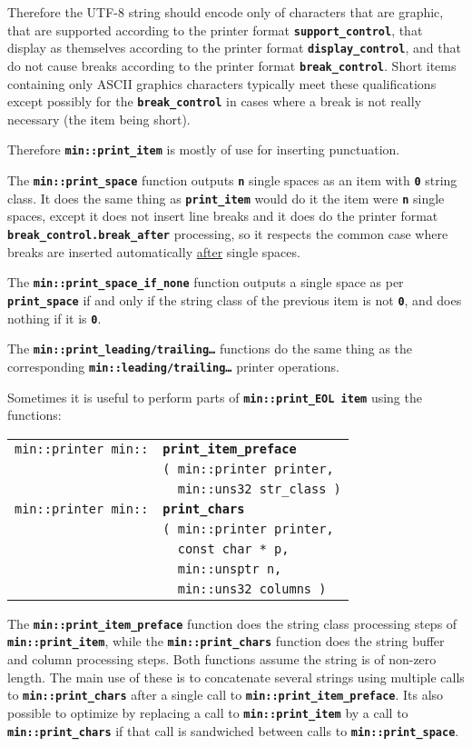 \documentclass[12pt]{article}
\makeatletter
\newcommand{\TT}[1]{{\tt \bfseries #1}}
\newcommand{\ttindex}[1]{\index{#1@{\tt #1}}}
\newcommand{\EOL}{\penalty \exhyphenpenalty}
\newenvironment{indpar}[1][0.3in]%
	{\begin{list}{}%
		     {\setlength{\itemsep}{0in}%
		      \setlength{\topsep}{0in}%
		      \setlength{\parsep}{1ex}%
		      \setlength{\labelwidth}{#1}%
		      \setlength{\leftmargin}{#1}%
		      \addtolength{\leftmargin}{\labelsep}}%
	 \item}%
	{\end{list}}
\newcommand{\LABEL}[1]{\label{#1}}
\newlength{\ARGBREAKLENGTH}
\newcommand{\ARGBREAK}[1][\ARGBREAKLENGTH]{\\&\hspace*{#1}}
\newcommand{\MINKEY}[1]%
	   {\TT{#1}\ttindex{min::#1}\ttindex{#1}}
\makeatother
\begin{document}
Therefore the UTF-8 string should encode only of characters
that are graphic, that are supported according to
the printer format \TT{support\_\EOL control},
that display as themselves according to the
printer format \TT{display\_\EOL control},
and that do not cause breaks according to the
printer format \TT{break\_\EOL control}.
Short items containing only ASCII graphics characters
typically meet these qualifications except possibly for
the \TT{break\_\EOL control} in cases where a break is not
really necessary (the item being short).

Therefore \TT{min::print\_item} is mostly of use for inserting
punctuation.

The \TT{min::print\_space} function outputs \TT{n} single spaces
as an item with \TT{0} string class.  It does the same thing
as \TT{print\_item} would do it the item were \TT{n} single spaces,
except it does not insert line breaks and it does do the
printer format \TT{break\_\EOL control.break\_\EOL after}
processing, so it respects the common case where breaks are inserted
automatically \underline{after} single spaces.

The \TT{min::print\_space\_if\_none} function outputs a single space
as per \TT{print\_space} if and only if the string class of the
previous item is not \TT{0}, and does nothing if it is \TT{0}.

The \TT{min::print\_leading/trailing\ldots} functions do the same thing as the
corresponding \TT{min::\EOL leading/\EOL trailing\ldots} printer operations.

Sometimes it is useful to perform parts of \TT{min::\EOL print\_EOL item}
using the functions:

\begin{indpar}[1em]\begin{tabular}{r@{}l}
\verb|min::printer min::| & \MINKEY{print\_item\_preface}\ARGBREAK
	\verb|( min::printer printer,|\ARGBREAK
	\verb|  min::uns32 str_class )|
\LABEL{MIN::PRINT_ITEM_PREFACE} \\
\verb|min::printer min::| & \MINKEY{print\_chars}\ARGBREAK
	\verb|( min::printer printer,|\ARGBREAK
	\verb|  const char * p,|\ARGBREAK
	\verb|  min::unsptr n,|\ARGBREAK
	\verb|  min::uns32 columns )|
\LABEL{MIN::PRINT_CHARS} \\
\end{tabular}\end{indpar}

The \TT{min::print\_item\_preface} function does the string class
processing steps of \TT{min::\EOL print\_\EOL item}, while the
\TT{min::print\_\EOL chars} function does the string buffer and column
processing steps.  Both functions assume the string is of non-zero
length.  The main use of these is to concatenate several strings
using multiple calls to \TT{min::\EOL print\_\EOL chars} after a
single call to \TT{min::\EOL print\_\EOL item\_\EOL preface}.
Its also possible to optimize by replacing a call to
\TT{min::\EOL print\_\EOL item} by a call to
\TT{min::\EOL print\_\EOL chars} if that call is sandwiched between
calls to \TT{min::\EOL print\_\EOL space}.
\end{document}
